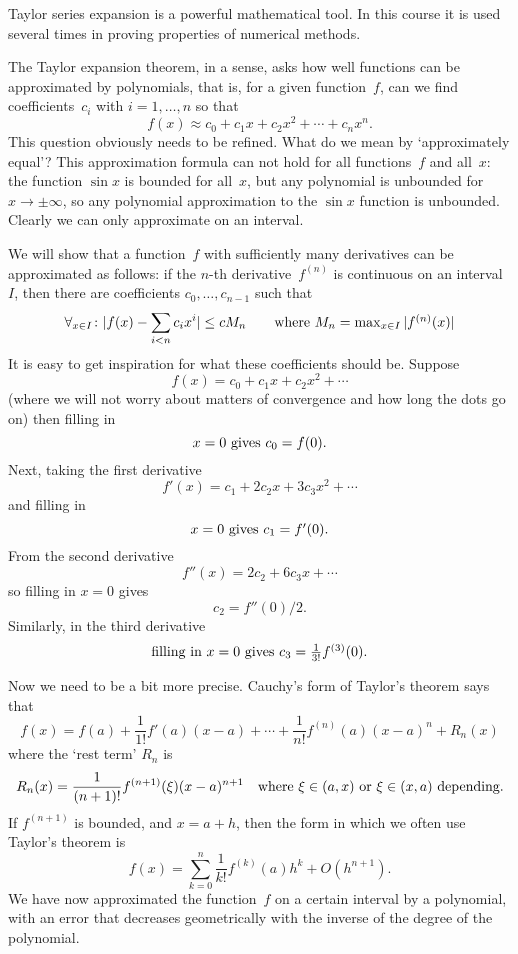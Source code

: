 
Taylor series expansion is a powerful mathematical tool. In this
course it is used several times in proving properties of numerical
methods.

The Taylor expansion theorem, in a sense, asks how well functions can
be approximated by polynomials, that is, for a given
function~$f$, can we find coefficients~$c_i$ with $i=1,\ldots,n$ so that
\[ f(x)\approx c_0+c_1x+c_2x^2+\cdots+c_nx^n.\]
This question obviously needs to be refined. What do we mean by
`approximately equal'? This approximation formula can not
hold for all functions~$f$ and all~$x$: the function $\sin x$ is
bounded for all~$x$, but any polynomial is unbounded for $x\rightarrow
\pm\infty$, so any polynomial approximation to the $\sin x$ function
is unbounded. Clearly we can only approximate on an interval.

We will show that a function~$f$ with sufficiently many derivatives
can be approximated as follows: if the $n$-th derivative~$f^{(n)}$ is
continuous on an interval~$I$, then there are coefficients
$c_0,\ldots,c_{n-1}$ such that
\[
  \forall_{x\in I}\colon |f(x)-\sum_{i<n}c_ix^i|\leq cM_n
    \qquad\hbox{where $M_n=\max_{x\in I}|f^{(n)}(x)|$}
\]
It is easy to get inspiration for what these coefficients should
be. Suppose
\[ f(x) = c_0+c_1x+c_2x^2+\cdots \]
(where we will not worry about matters of convergence and how long the
dots go on) then filling in
\[ \hbox{$x=0$ gives $c_0=f(0)$.} \]
Next, taking the first derivative 
\[ f'(x) = c_1+2c_2x+3c_3x^2+\cdots \]
and filling in
\[ \hbox{$x=0$ gives $c_1=f'(0)$.} \]
From the second derivative
\[ f''(x) = 2c_2+6c_3x+\cdots \]
so filling in $x=0$ gives
\[ c_2=f''(0)/2. \]
Similarly, in the third derivative
\[ \hbox{filling in $x=0$ gives $c_3=\frac1{3!}f^{(3)}(0)$.} \]

Now we need to be a bit more precise. Cauchy's form of Taylor's
theorem says that
\[ f(x) = 
    f(a)+\frac1{1!}f'(a)(x-a)+\cdots+\frac1{n!}f^{(n)}(a)(x-a)^n
    +R_n(x)
\]
where the `rest term' $R_n$ is 
\[ R_n(x) = \frac1{(n+1)!}f^{(n+1)}(\xi)(x-a)^{n+1}
    \quad\hbox{where $\xi\in(a,x)$ or $\xi\in(x,a)$ depending.}
\]
If $f^{(n+1)}$ is bounded, and $x=a+h$, then the form in which we
often use
Taylor's theorem is 
\[ f(x) = \sum_{k=0}^n \frac1{k!}f^{(k)}(a)h^k+O(h^{n+1}).\]
We have now approximated the function~$f$ on a certain interval by a
polynomial, with an error that decreases geometrically with the
inverse of the degree of the polynomial.

